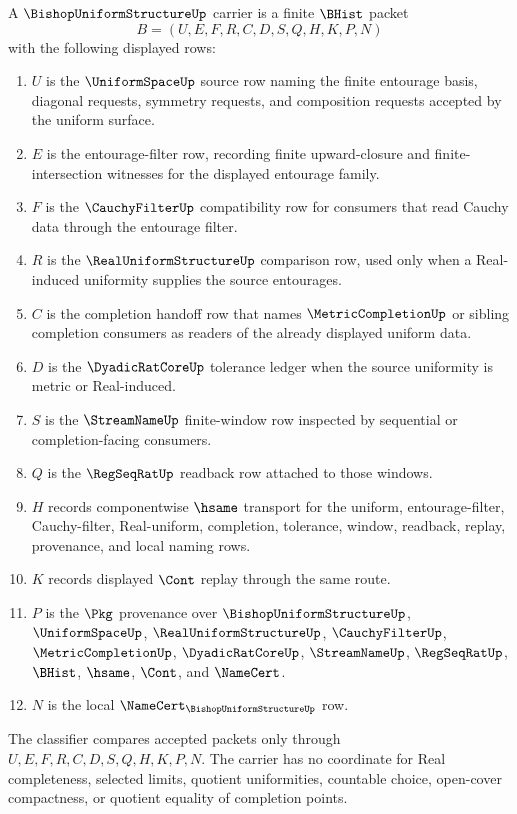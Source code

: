 \begin{definition}
\label{def:bishop-uniform-structure-carrier}
A $\BishopUniformStructureUp$ carrier is a finite $\BHist$ packet
$$
B=(U,E,F,R,C,D,S,Q,H,K,P,N)
$$
with the following displayed rows:
\begin{enumerate}
\item $U$ is the $\UniformSpaceUp$ source row naming the finite entourage basis, diagonal requests, symmetry requests, and composition requests accepted by the uniform surface.
\item $E$ is the entourage-filter row, recording finite upward-closure and finite-intersection witnesses for the displayed entourage family.
\item $F$ is the $\CauchyFilterUp$ compatibility row for consumers that read Cauchy data through the entourage filter.
\item $R$ is the $\RealUniformStructureUp$ comparison row, used only when a Real-induced uniformity supplies the source entourages.
\item $C$ is the completion handoff row that names $\MetricCompletionUp$ or sibling completion consumers as readers of the already displayed uniform data.
\item $D$ is the $\DyadicRatCoreUp$ tolerance ledger when the source uniformity is metric or Real-induced.
\item $S$ is the $\StreamNameUp$ finite-window row inspected by sequential or completion-facing consumers.
\item $Q$ is the $\RegSeqRatUp$ readback row attached to those windows.
\item $H$ records componentwise $\hsame$ transport for the uniform, entourage-filter, Cauchy-filter, Real-uniform, completion, tolerance, window, readback, replay, provenance, and local naming rows.
\item $K$ records displayed $\Cont$ replay through the same route.
\item $P$ is the $\Pkg$ provenance over $\BishopUniformStructureUp$, $\UniformSpaceUp$, $\RealUniformStructureUp$, $\CauchyFilterUp$, $\MetricCompletionUp$, $\DyadicRatCoreUp$, $\StreamNameUp$, $\RegSeqRatUp$, $\BHist$, $\hsame$, $\Cont$, and $\NameCert$.
\item $N$ is the local $\NameCert_{\BishopUniformStructureUp}$ row.
\end{enumerate}
The classifier compares accepted packets only through $U,E,F,R,C,D,S,Q,H,K,P,N$. The carrier has no coordinate for Real completeness, selected limits, quotient uniformities, countable choice, open-cover compactness, or quotient equality of completion points.
\end{definition}

